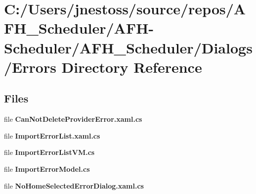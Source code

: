 \section{C\+:/\+Users/jnestoss/source/repos/\+A\+F\+H\+\_\+\+Scheduler/\+A\+F\+H-\/\+Scheduler/\+A\+F\+H\+\_\+\+Scheduler/\+Dialogs/\+Errors Directory Reference}
\label{dir_14a290e1661def76c8b5cf12dfdb3156}
\subsection*{Files}
\begin{DoxyCompactItemize}
\item 
file \textbf{ Can\+Not\+Delete\+Provider\+Error.\+xaml.\+cs}
\item 
file \textbf{ Import\+Error\+List.\+xaml.\+cs}
\item 
file \textbf{ Import\+Error\+List\+V\+M.\+cs}
\item 
file \textbf{ Import\+Error\+Model.\+cs}
\item 
file \textbf{ No\+Home\+Selected\+Error\+Dialog.\+xaml.\+cs}
\end{DoxyCompactItemize}
